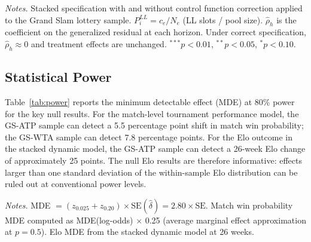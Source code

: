 \begin{table}[htbp]
\centering
\caption{Control Function Specification Check: Grand Slam Samples}
\label{tab:cf_validation}
\begin{threeparttable}
\small

\begin{tablenotes}
\footnotesize
\item \textit{Notes.} Stacked specification with and without control function correction applied to the Grand Slam lottery sample. $P_i^{LL} = c_e / N_e$ (LL slots / pool size). $\hat{\rho}_h$ is the coefficient on the generalized residual at each horizon. Under correct specification, $\hat{\rho}_h \approx 0$ and treatment effects are unchanged. $^{***}p<0.01$, $^{**}p<0.05$, $^{*}p<0.10$.
\end{tablenotes}
\end{threeparttable}
\end{table}

\subsection{Statistical Power}
\label{sec:robustness_power}

Table~\ref{tab:power} reports the minimum detectable effect (MDE) at 80\% power for the key null results. For the match-level tournament performance model, the GS-ATP sample can detect a 5.5 percentage point shift in match win probability; the GS-WTA sample can detect 7.8 percentage points. For the Elo outcome in the stacked dynamic model, the GS-ATP sample can detect a 26-week Elo change of approximately 25 points. The null Elo results are therefore informative: effects larger than one standard deviation of the within-sample Elo distribution can be ruled out at conventional power levels.

\begin{table}[htbp]
\centering
\caption{Minimum Detectable Effects at 80\% Power}
\label{tab:power}
\begin{threeparttable}
\small

\begin{tablenotes}
\footnotesize
\item \textit{Notes.} MDE $= (z_{0.025} + z_{0.20}) \times \text{SE}(\hat{\delta}) = 2.80 \times \text{SE}$. Match win probability MDE computed as MDE(log-odds) $\times$ 0.25 (average marginal effect approximation at $p = 0.5$). Elo MDE from the stacked dynamic model at 26 weeks.
\end{tablenotes}
\end{threeparttable}
\end{table}
